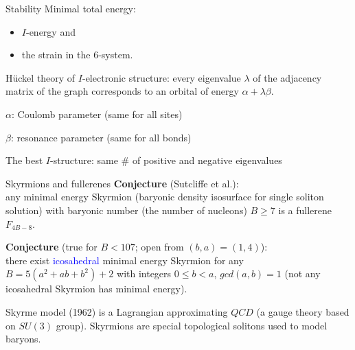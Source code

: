 \documentclass[%
pdf,
colorBG,
slideColor,
]{prosper}
\begin{document}
\begin{slide}{Stability}
Minimal total energy:
\begin{itemize}
\item $I$-energy and
\item the strain in the $6$-system.
\end{itemize}
H\"uckel theory of $I$-electronic structure: every eigenvalue $\lambda$ of the adjacency matrix of the graph corresponds to an orbital of energy $\alpha+\lambda \beta$.

$\alpha$: Coulomb parameter (same for all sites)

$\beta$: resonance parameter (same for all bonds)

The best $I$-structure: same \# of positive and negative eigenvalues 

\end{slide}

\begin{slide}{Skyrmions and fullerenes}
{\bf Conjecture} (Sutcliffe et al.):\\
any minimal energy Skyrmion (baryonic density isosurface for
single soliton solution) with baryonic number (the number of nucleons)
$B \ge 7$ is a fullerene $F_{4B-8}$.

{\bf Conjecture} (true for $B<107$; open from $(b,a)=(1,4)$):\\
there exist \textcolor{blue}{icosahedral} minimal energy Skyrmion for
any $B=5(a^2+ab+b^2)+2$ with integers $0 \le b <a$, $gcd(a,b)=1$
(not any icosahedral Skyrmion has minimal energy).

\vspace{3mm}
Skyrme model (1962) is a Lagrangian approximating $QCD$ (a gauge theory 
based on $SU(3)$ group). Skyrmions are special topological solitons used to 
model baryons.   

\end{slide}
\end{document}
